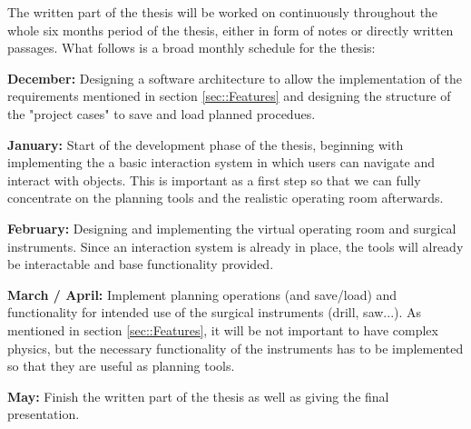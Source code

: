 The written part of the thesis will be worked on continuously throughout the whole six months period of the thesis, either in form of notes or directly written passages. What follows is a broad monthly schedule for the thesis:

\textbf{December:}
Designing a software architecture to allow the implementation of the requirements mentioned in section \ref{sec::Features} and designing the structure of the "project cases" to save and load planned procedues.

\textbf{January:}
Start of the development phase of the thesis, beginning with implementing the a basic interaction system in which users can navigate and interact with objects.
This is important as a first step so that we can fully concentrate on the planning tools and the realistic operating room afterwards.

\textbf{February:}
Designing and implementing the virtual operating room and surgical instruments. Since an interaction system is already in place, the tools will already be interactable and base functionality provided.

\textbf{March / April:}
Implement planning operations (and save/load) and functionality for intended use of the surgical instruments (drill, saw...).
As mentioned in section \ref{sec::Features}, it will be not important to have complex physics, but the necessary functionality of the instruments has to be implemented so that they are useful as planning tools.

\textbf{May:}
Finish the written part of the thesis as well as giving the final presentation.




